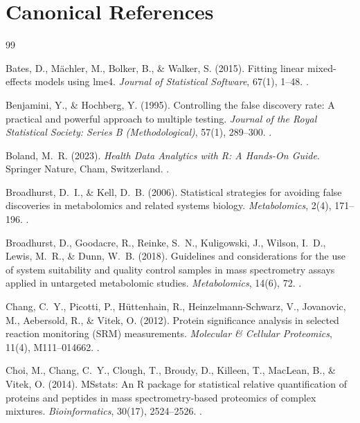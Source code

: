 \documentclass[11pt,twoside,openright]{book}
\begin{document}
\section*{Canonical References}

\begin{thebibliography}{99}

Bates, D., M\"achler, M., Bolker, B., \& Walker, S. (2015). Fitting linear mixed-effects models using lme4. \textit{Journal of Statistical Software}, 67(1), 1--48. .

Benjamini, Y., \& Hochberg, Y. (1995). Controlling the false discovery rate: A practical and powerful approach to multiple testing. \textit{Journal of the Royal Statistical Society: Series B (Methodological)}, 57(1), 289--300. .

Boland, M.~R. (2023). \textit{Health Data Analytics with R: A Hands-On Guide}. Springer Nature, Cham, Switzerland. .

Broadhurst, D.~I., \& Kell, D.~B. (2006). Statistical strategies for avoiding false discoveries in metabolomics and related systems biology. \textit{Metabolomics}, 2(4), 171--196. .

Broadhurst, D., Goodacre, R., Reinke, S.~N., Kuligowski, J., Wilson, I.~D., Lewis, M.~R., \& Dunn, W.~B. (2018). Guidelines and considerations for the use of system suitability and quality control samples in mass spectrometry assays applied in untargeted metabolomic studies. \textit{Metabolomics}, 14(6), 72. .

Chang, C.~Y., Picotti, P., H\"uttenhain, R., Heinzelmann-Schwarz, V., Jovanovic, M., Aebersold, R., \& Vitek, O. (2012). Protein significance analysis in selected reaction monitoring (SRM) measurements. \textit{Molecular \& Cellular Proteomics}, 11(4), M111--014662. .

Choi, M., Chang, C.~Y., Clough, T., Broudy, D., Killeen, T., MacLean, B., \& Vitek, O. (2014). MSstats: An R package for statistical relative quantification of proteins and peptides in mass spectrometry-based proteomics of complex mixtures. \textit{Bioinformatics}, 30(17), 2524--2526. .


\end{thebibliography}
\end{document}
